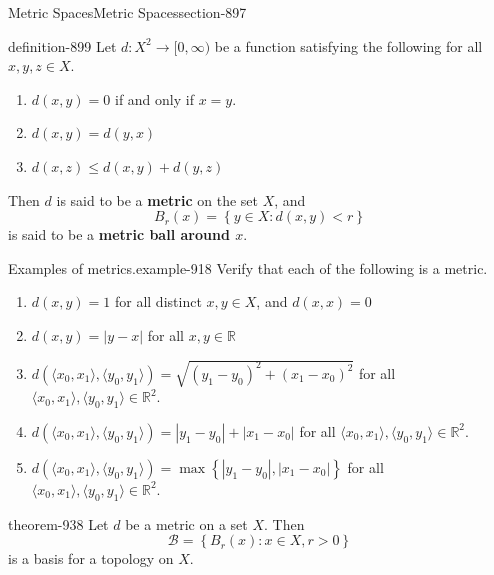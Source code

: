 \documentclass[oneside,10pt,]{article}
\newcommand{\terminology}[1]{\textbf{#1}}
\newcommand{\tuple}[1]{\langle #1 \rangle}
\newcommand{\mb}{\mathbb}
\newcommand{\mc}{\mathcal}
\newcommand{\setBuilder}[2]{\left\{#1:#2\right\}}
\newcommand{\setList}[1]{\left\{#1\right\}}
\newcommand{\lt}{<}
\begin{document}
\begin{sectionptx}{Metric Spaces}{}{Metric Spaces}{}{}{section-897}
\begin{definition}{}{definition-899}%
\hypertarget{p-900}{}%
Let \(d:X^2\to[0,\infty)\) be a function satisfying the following for all \(x,y,z\in X\).%
\leavevmode%
\begin{enumerate}
\item\hypertarget{li-904}{}\(d(x,y)=0\) if and only if \(x=y\).%
\item\hypertarget{li-907}{}\(d(x,y)=d(y,x)\)%
\item\hypertarget{li-909}{}\(d(x,z)\leq d(x,y)+d(y,z)\)%
\end{enumerate}
\hypertarget{p-911}{}%
Then \(d\) is said to be a \terminology{metric} on the set \(X\), and%
\begin{equation*}
B_r(x)=\setBuilder{y\in X}{d(x,y)\lt r}
\end{equation*}
is said to be a \terminology{metric ball around \(x\)}.%
\end{definition}
\begin{example}{Examples of metrics.}{example-918}%
\hypertarget{p-920}{}%
Verify that each of the following is a metric.%
\leavevmode%
\begin{enumerate}
\item\hypertarget{li-922}{}\(d(x,y)=1\) for all distinct \(x,y\in X\), and \(d(x,x)=0\)%
\item\hypertarget{li-926}{}\(d(x,y)=|y-x|\) for all \(x,y\in\mb R\)%
\item\hypertarget{li-929}{}\(d(\tuple{x_0,x_1},\tuple{y_0,y_1})=\sqrt{(y_1-y_0)^2+(x_1-x_0)^2}\) for all \(\tuple{x_0,x_1},\tuple{y_0,y_1}\in\mb R^2\).%
\item\hypertarget{li-932}{}\(d(\tuple{x_0,x_1},\tuple{y_0,y_1})=|y_1-y_0|+|x_1-x_0|\) for all \(\tuple{x_0,x_1},\tuple{y_0,y_1}\in\mb R^2\).%
\item\hypertarget{li-935}{}\(d(\tuple{x_0,x_1},\tuple{y_0,y_1})=\max\setList{|y_1-y_0|,|x_1-x_0|}\) for all \(\tuple{x_0,x_1},\tuple{y_0,y_1}\in\mb R^2\).%
\end{enumerate}
\end{example}
\begin{theorem}{}{}{theorem-938}%
\hypertarget{p-939}{}%
Let \(d\) be a metric on a set \(X\). Then%
\begin{equation*}
\mc B=\setBuilder{B_r(x)}{x\in X,r>0}
\end{equation*}
is a basis for a topology on \(X\).%
\end{theorem}

\end{sectionptx}
\end{document}
